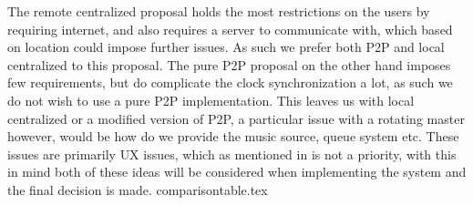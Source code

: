 The remote centralized proposal holds the most restrictions on the users by requiring internet, and also requires a server to communicate with, which based on location could impose further issues.
As such we prefer both \ac{P2P} and local centralized to this proposal.
The pure \ac{P2P} proposal on the other hand imposes few requirements, but do complicate the clock synchronization a lot, as such we do not wish to use a pure \ac{P2P} implementation.
This leaves us with local centralized or a modified version of \ac{P2P}, a particular issue with a rotating master however, would be how do we provide the music source, queue system etc.
These issues are primarily \ac{UX} issues, which as mentioned in  is not a priority, with this in mind both of these ideas will be considered when implementing the system and the final decision is made.
{comparisontable.tex}
